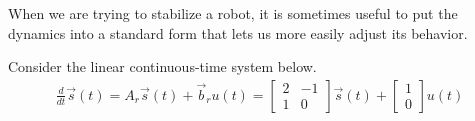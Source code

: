 
When we are trying to stabilize a robot, it is sometimes useful to put
the dynamics into a standard form that lets us more easily adjust its
behavior. 

Consider the linear continuous-time system below.
\begin{align*}
\frac{d}{dt}\vec{s}(t) 
= A_r\vec{s}(t) + \vec{b}_r {u}(t)
=\begin{bmatrix}
 2 & -1 \\
 1 & 0 
\end{bmatrix} 
\vec{s}(t) +
\begin{bmatrix}
1 \\ 0 
\end{bmatrix}
u(t)
\end{align*} 

